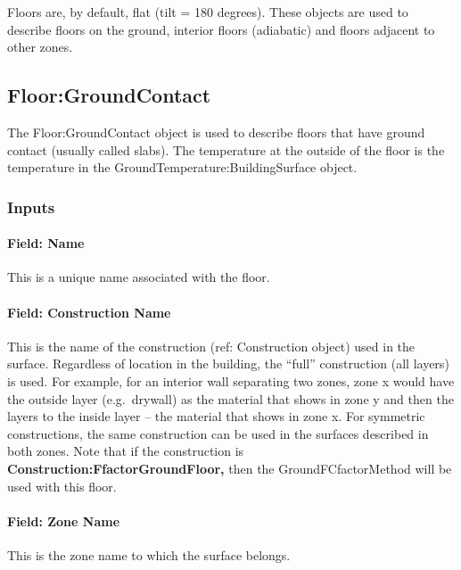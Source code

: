 Floors are, by default, flat (tilt = 180 degrees). These objects are used to describe floors on the ground, interior floors (adiabatic) and floors adjacent to other zones.

\subsection{Floor:GroundContact}\label{floorgroundcontact}

The Floor:GroundContact object is used to describe floors that have ground contact (usually called slabs). The temperature at the outside of the floor is the temperature in the GroundTemperature:BuildingSurface object.

\subsubsection{Inputs}\label{inputs-11-021}

\paragraph{Field: Name}\label{field-name-7-022}

This is a unique name associated with the floor.

\paragraph{Field: Construction Name}\label{field-construction-name-7}

This is the name of the construction (ref: Construction object) used in the surface. Regardless of location in the building, the ``full'' construction (all layers) is used. For example, for an interior wall separating two zones, zone x would have the outside layer (e.g.~drywall) as the material that shows in zone y and then the layers to the inside layer -- the material that shows in zone x. For symmetric constructions, the same construction can be used in the surfaces described in both zones. Note that if the construction is \textbf{Construction:FfactorGroundFloor,} then the GroundFCfactorMethod will be used with this floor.

\paragraph{Field: Zone Name}\label{field-zone-name-7-004}

This is the zone name to which the surface belongs.

